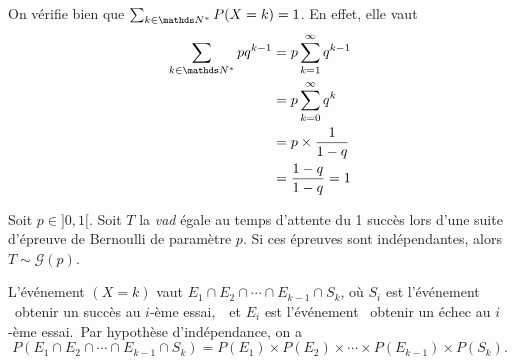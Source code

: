 On vérifie bien que $\sum_{k \in \N^*} P(X=k) = 1$. En effet, elle vaut
\begin{align*}
  \sum_{k \in \N^*} p q^{k-1} &= p \sum_{k=1}^\infty q^{k-1}\\
  &= p \sum_{k=0}^\infty q^k \\
  &= p \times \frac{1}{1-q} \\
  &= \frac{1-q}{1-q} = 1 \\
\end{align*}

\begin{prop}
  Soit $p \in {]0,1[}$. Soit $T$\/ la \textit{vad} égale au temps d'attente du 1 succès lors d'une suite d'épreuve de Bernoulli de paramètre $p$. Si ces épreuves sont indépendantes, alors $T \sim\mathcal{G}(p)$.
\end{prop}

\begin{prv}
  L'événement $(X = k)$\/ vaut $E_1 \cap E_2 \cap \cdots \cap E_{k-1} \cap S_k$, où $S_i$\/ est l'événement \guillemotleft~obtenir un succès au $i$-ème essai,~\guillemotright\ et $E_i$\/ est l'événement \guillemotleft~obtenir un échec au $i$-ème essai.\footnotemark~\guillemotright\@ Par hypothèse d'indépendance, on a \[
    P(E_1 \cap E_2 \cap \cdots \cap E_{k-1} \cap S_k) = P(E_1) \times P(E_2) \times \cdots \times P(E_{k-1}) \times P(S_k)
  .\]
\end{prv}

